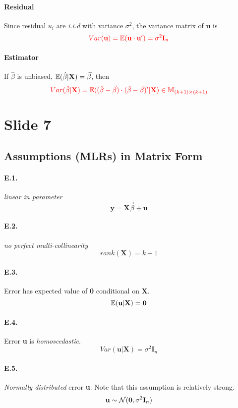 \documentclass[]{article}
\begin{document}
    			\paragraph{Residual} Since residual $u_i$ are \emph{i.i.d} with variance $\sigma^2$, the variance matrix of $\textbf{u}$ is
    			\[\textcolor{red}{
    				Var(\textbf{u}) = \mathbb{E}({\textbf{u} \cdot \textbf{u}'}) = \sigma^2 \textbf{I}_n
    			}\]
    			
    			\paragraph{Estimator} If $\hat{\beta}$ is unbiased, $\mathbb{E}({\hat{\beta} | \textbf{X}}) = \vec{\beta}$, then 
    			\[\textcolor{red}{
    				Var(\hat{\beta}|\textbf{X}) = \mathbb{E}({(\hat{\beta} - \vec{\beta})\cdot(\hat{\beta} - \vec{\beta})' | \textbf{X}}) \in \mathbb{M}_{(k+1) \times (k+1)}
    			}\]
    \section{Slide 7}
    	\subsection{Assumptions (MLRs) in Matrix Form}
    		\paragraph{E.1.} \emph{linear in parameter}
    		\[
    			\textbf{y} = \textbf{X}\vec{\beta} + \textbf{u}
    		\]
    		\paragraph{E.2.} \emph{no perfect multi-collinearity}
    		\[
    			rank(\textbf{X}) = k +1
    		\]
    		\paragraph{E.3.} Error has expected value of \textbf{0} conditional on \textbf{X}.
    		\[
    			\mathbb{E}({\textbf{u}|\textbf{X}}) = \textbf{0}
    		\]
    		\paragraph{E.4.} Error \textbf{u} is \emph{homoscedastic}.
    		\[
    			Var(\textbf{u}|\textbf{X}) = \sigma^2 \textbf{I}_n
    		\]
    		\paragraph{E.5.} \emph{Normally distributed} error \textbf{u}. Note that this assumption is relatively strong.
    		\[
    			\textbf{u} \sim \mathcal{{N}}(\textbf{0}, \sigma^2 \textbf{I}_n)
    		\]
\end{document}

